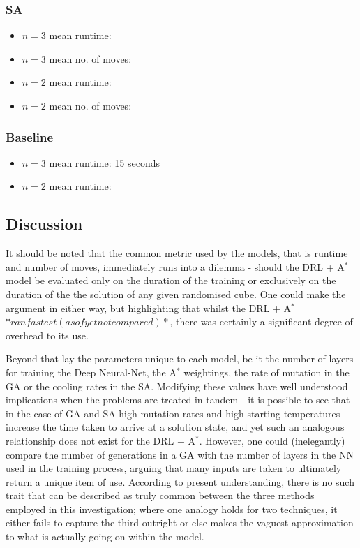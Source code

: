 \documentclass[UKenglish]{svproc}
\begin{document}
\subsubsection{SA}
\begin{itemize}
    \item $n=3$ mean runtime:
    \item $n=3$ mean no. of moves:
    \item $n=2$ mean runtime:
    \item $n=2$ mean no. of moves:
\end{itemize}

\subsubsection{Baseline}
\begin{itemize}
    \item $n=3$ mean runtime: 15 seconds %
    \item $n=2$ mean runtime:
\end{itemize}

\subsection{Discussion}
It should be noted that the common metric used by the models, that is runtime and number of moves, immediately runs into a dilemma - should the DRL + A$^{\ast}$ model be evaluated only on the duration of the training or exclusively on the duration of the the solution of any given randomised cube. One could make the argument in either way, but highlighting that whilst the DRL + A$^{\ast}$ $\ast ran fastest (as of yet not compared)\ast$, there was certainly a significant degree of overhead to its use. \par Beyond that lay the parameters unique to each model, be it the number of layers for training the Deep Neural-Net, the A$^{\ast}$ weightings, the rate of mutation in the GA or the cooling rates in the SA. Modifying these values have well understood implications when the problems are treated in tandem - it is possible to see that in the case of GA and SA high mutation rates and high starting temperatures increase the time taken to arrive at a solution state, and yet such an analogous relationship does not exist for the DRL + A$^{\ast}$. However, one could (inelegantly) compare the number of generations in a GA with the number of layers in the NN used in the training process, arguing that many inputs are taken to ultimately return a unique item of use. According to present understanding, there is no such trait that can be described as truly common between the three methods employed in this investigation; where one analogy holds for two techniques, it either fails to capture the third outright or else makes the vaguest approximation to what is actually going on within the model.
\end{document}
